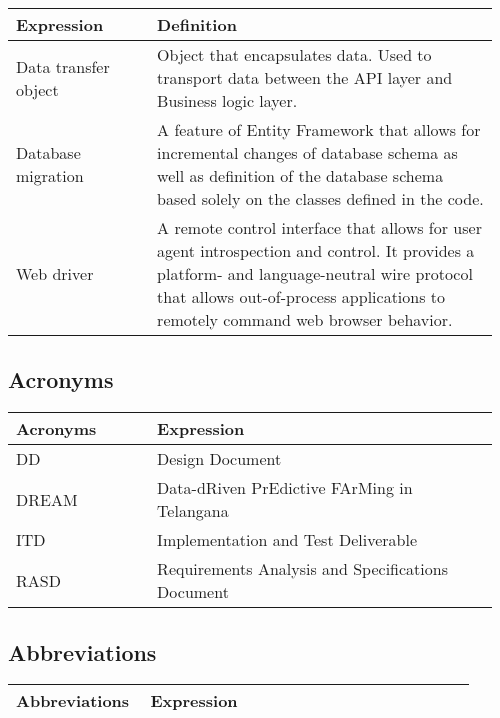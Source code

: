 \begin{center}
    \begin{longtable}{@{}p{0.28\linewidth} p{0.68\linewidth}@{}}
		\toprule
		\textbf{Expression}     & \textbf{Definition}\\
		
		\midrule
        Data transfer object & Object that encapsulates data. Used to transport data between the API layer and Business logic layer. \\
        Database migration & A feature of Entity Framework that allows for incremental changes of database schema as well as definition of the database schema based solely on the classes defined in the code. \\
        Web driver & A remote control interface that allows for user agent introspection and control. It provides a platform- and language-neutral wire protocol that allows out-of-process applications to remotely command web browser behavior.\\
	\end{longtable}
\end{center}

\subsection{Acronyms}

\begin{center}
	\begin{longtable}{@{}p{0.28\linewidth} p{0.68\linewidth}@{}}
		\toprule
		\textbf{Acronyms}   & \textbf{Expression}\\
		\endfirsthead
		\midrule
		DD                  & Design Document\\
		DREAM               & Data-dRiven PrEdictive FArMing in Telangana\\
		ITD					& Implementation and Test Deliverable\\
		RASD                & Requirements Analysis and Specifications Document\\
		\bottomrule
	\end{longtable}
\end{center}

\subsection{Abbreviations}

\begin{center}
	\begin{longtable}{@{}p{0.28\linewidth} p{0.68\linewidth}@{}}
		\toprule
		\textbf{Abbreviations}  & \textbf{Expression}\\
		\midrule
	    
		\bottomrule
	\end{longtable}
\end{center}

